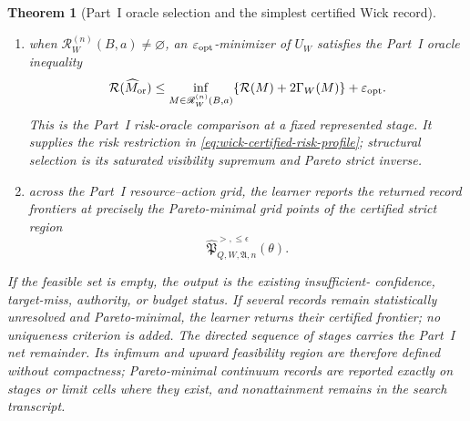 \documentclass[11pt]{article}
\numberwithin{section}{part}
\theoremstyle{plain}
\newtheorem{theorem}{Theorem}[section]
\theoremstyle{definition}
\theoremstyle{remark}
\begin{document}
\begin{theorem}[Part~I oracle selection and the simplest certified Wick record]
\begin{enumerate}[label=\textup{(\roman*)}]
belongs to \(\mathscr F_W(\epsilon,\theta;B,a)\), and some
\(\widehat M\in\widehat{\mathscr M}_W(\epsilon,\theta;B,a)\) obeys
\begin{equation}
 \label{eq:wick-certified-simplicity-bound}
 \mathbf c(\widehat M)\preceq\mathbf c(M_0);
\end{equation}
\item when \(\mathscr R_W^{(n)}(B,a)\ne\varnothing\), an
\(\varepsilon_{\rm opt}\)-minimizer of \(U_W\) satisfies the Part~I oracle
inequality
\begin{equation}
 \label{eq:wick-penalized-minimal-oracle}
 \mathcal R(\widehat M_{\rm or})
 \le\inf_{M\in\mathscr R_W^{(n)}(B,a)}
 \{\mathcal R(M)+2\Gamma_W(M)\}+\varepsilon_{\rm opt}.
\end{equation}
This is the Part~I risk-oracle comparison at a fixed represented stage.  It
supplies the risk restriction in
\eqref{eq:wick-certified-risk-profile}; structural selection is its saturated
visibility supremum and Pareto strict inverse.
\item across the Part~I resource--action grid, the learner reports the
returned record frontiers at precisely the Pareto-minimal grid points of the
certified strict region
\[
 \widehat{\mathfrak P}_{Q,W,\mathfrak A,n}^{>,\le\epsilon}(\theta).
\]
\end{enumerate}
If the feasible set is empty, the output is the existing insufficient-
confidence, target-miss, authority, or budget status.  If several records
remain statistically unresolved and Pareto-minimal, the learner returns their
certified frontier; no uniqueness criterion is added.  The directed sequence
of stages carries the Part~I net remainder.  Its infimum and upward
feasibility region are therefore defined without compactness; Pareto-minimal
continuum records are reported exactly on stages or limit cells where they
exist, and nonattainment remains in the search transcript.
\end{theorem}
\end{document}
